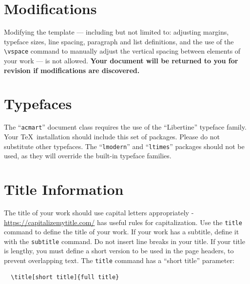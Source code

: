 \documentclass[sigplan,screen]{acmart}
\begin{document}
\section{Modifications}
Modifying the template --- including but not limited to: adjusting
margins, typeface sizes, line spacing, paragraph and list definitions,
and the use of the \verb|\vspace| command to manually adjust the
vertical spacing between elements of your work --- is not allowed.
	{\bfseries Your document will be returned to you for revision if
		modifications are discovered.}
\section{Typefaces}
The ``\verb|acmart|'' document class requires the use of the
``Libertine'' typeface family. Your \TeX\ installation should include
this set of packages. Please do not substitute other typefaces. The
``\verb|lmodern|'' and ``\verb|ltimes|'' packages should not be used,
as they will override the built-in typeface families.
\section{Title Information}
The title of your work should use capital letters appropriately -
\url{https://capitalizemytitle.com/} has useful rules for
capitalization. Use the {\verb|title|} command to define the title of
your work. If your work has a subtitle, define it with the
	{\verb|subtitle|} command.  Do not insert line breaks in your title.
If your title is lengthy, you must define a short version to be used
in the page headers, to prevent overlapping text. The \verb|title|
command has a ``short title'' parameter:
\begin{verbatim}
  \title[short title]{full title}
\end{verbatim}
\end{document}
